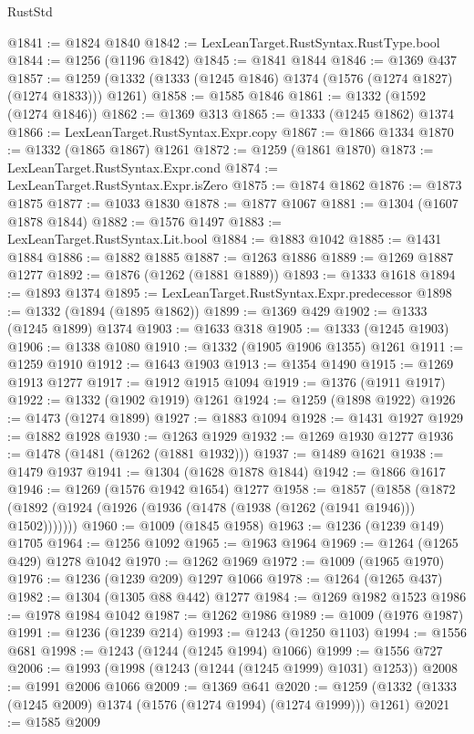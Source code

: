 \begin{lexlean}{RustStd}
\begin{coremodule}
@1841 := @1824 @1840
@1842 := LexLeanTarget.RustSyntax.RustType.bool
@1844 := @1256 (@1196 @1842)
@1845 := @1841 @1844
@1846 := @1369 @437
@1857 := @1259 (@1332 (@1333 (@1245 @1846) @1374 (@1576 (@1274 @1827) (@1274 @1833))) @1261)
@1858 := @1585 @1846
@1861 := @1332 (@1592 (@1274 @1846))
@1862 := @1369 @313
@1865 := @1333 (@1245 @1862) @1374
@1866 := LexLeanTarget.RustSyntax.Expr.copy
@1867 := @1866 @1334
@1870 := @1332 (@1865 @1867) @1261
@1872 := @1259 (@1861 @1870)
@1873 := LexLeanTarget.RustSyntax.Expr.cond
@1874 := LexLeanTarget.RustSyntax.Expr.isZero
@1875 := @1874 @1862
@1876 := @1873 @1875
@1877 := @1033 @1830
@1878 := @1877 @1067
@1881 := @1304 (@1607 @1878 @1844)
@1882 := @1576 @1497
@1883 := LexLeanTarget.RustSyntax.Lit.bool
@1884 := @1883 @1042
@1885 := @1431 @1884
@1886 := @1882 @1885
@1887 := @1263 @1886
@1889 := @1269 @1887 @1277
@1892 := @1876 (@1262 (@1881 @1889))
@1893 := @1333 @1618
@1894 := @1893 @1374
@1895 := LexLeanTarget.RustSyntax.Expr.predecessor
@1898 := @1332 (@1894 (@1895 @1862))
@1899 := @1369 @429
@1902 := @1333 (@1245 @1899) @1374
@1903 := @1633 @318
@1905 := @1333 (@1245 @1903)
@1906 := @1338 @1080
@1910 := @1332 (@1905 @1906 @1355) @1261
@1911 := @1259 @1910
@1912 := @1643 @1903
@1913 := @1354 @1490
@1915 := @1269 @1913 @1277
@1917 := @1912 @1915 @1094
@1919 := @1376 (@1911 @1917)
@1922 := @1332 (@1902 @1919) @1261
@1924 := @1259 (@1898 @1922)
@1926 := @1473 (@1274 @1899)
@1927 := @1883 @1094
@1928 := @1431 @1927
@1929 := @1882 @1928
@1930 := @1263 @1929
@1932 := @1269 @1930 @1277
@1936 := @1478 (@1481 (@1262 (@1881 @1932)))
@1937 := @1489 @1621
@1938 := @1479 @1937
@1941 := @1304 (@1628 @1878 @1844)
@1942 := @1866 @1617
@1946 := @1269 (@1576 @1942 @1654) @1277
@1958 := @1857
    (@1858 (@1872 (@1892 (@1924 (@1926 (@1936 (@1478 (@1938 (@1262 (@1941 @1946))) @1502)))))))
@1960 := @1009 (@1845 @1958)
@1963 := @1236 (@1239 @149) @1705
@1964 := @1256 @1092
@1965 := @1963 @1964
@1969 := @1264 (@1265 @429) @1278 @1042
@1970 := @1262 @1969
@1972 := @1009 (@1965 @1970)
@1976 := @1236 (@1239 @209) @1297 @1066
@1978 := @1264 (@1265 @437)
@1982 := @1304 (@1305 @88 @442) @1277
@1984 := @1269 @1982 @1523
@1986 := @1978 @1984 @1042
@1987 := @1262 @1986
@1989 := @1009 (@1976 @1987)
@1991 := @1236 (@1239 @214)
@1993 := @1243 (@1250 @1103)
@1994 := @1556 @681
@1998 := @1243 (@1244 (@1245 @1994) @1066)
@1999 := @1556 @727
@2006 := @1993 (@1998 (@1243 (@1244 (@1245 @1999) @1031) @1253))
@2008 := @1991 @2006 @1066
@2009 := @1369 @641
@2020 := @1259 (@1332 (@1333 (@1245 @2009) @1374 (@1576 (@1274 @1994) (@1274 @1999))) @1261)
@2021 := @1585 @2009

\end{coremodule}
\end{lexlean}
